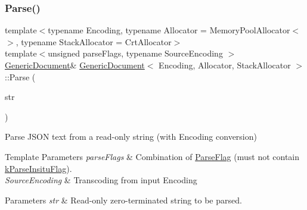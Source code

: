 \subsubsection{\texorpdfstring{Parse()}{Parse()}\hspace{0.1cm}{\footnotesize\ttfamily [1/3]}}
{\footnotesize\ttfamily template$<$typename Encoding, typename Allocator = Memory\+Pool\+Allocator$<$$>$, typename Stack\+Allocator = Crt\+Allocator$>$ \\
template$<$unsigned parse\+Flags, typename Source\+Encoding $>$ \\
\hyperlink{class_generic_document}{Generic\+Document}\& \hyperlink{class_generic_document}{Generic\+Document}$<$ Encoding, Allocator, Stack\+Allocator $>$\+::Parse (\begin{DoxyParamCaption}\item[{const typename Source\+Encoding\+::\+Ch $\ast$}]{str }\end{DoxyParamCaption})\hspace{0.3cm}{\ttfamily [inline]}}



Parse J\+S\+ON text from a read-\/only string (with Encoding conversion) 


\begin{DoxyTemplParams}{Template Parameters}
{\em parse\+Flags} & Combination of \hyperlink{reader_8h_ab7be7dabe6ffcba60fad441505583450}{Parse\+Flag} (must not contain \hyperlink{reader_8h_ab7be7dabe6ffcba60fad441505583450a13188bd483b4df0b6582bebe2aeb5b01}{k\+Parse\+Insitu\+Flag}). \\
\hline
{\em Source\+Encoding} & Transcoding from input Encoding \\
\hline
\end{DoxyTemplParams}

\begin{DoxyParams}{Parameters}
{\em str} & Read-\/only zero-\/terminated string to be parsed. \\
\hline
\end{DoxyParams}
\mbox{\label{class_generic_document_a5e377f840009b5cee6757be29525ce0b}} 
